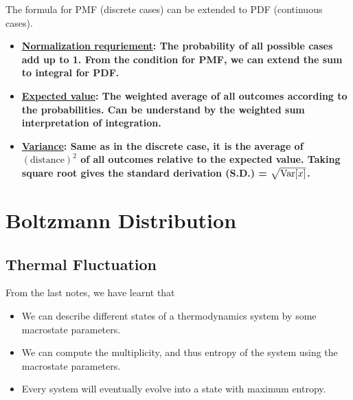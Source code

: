 \documentclass[class=article, crop=false, 12pt]{standalone}
\begin{document}
\newpage
The formula for PMF (discrete cases) can be extended to PDF (continuous cases).
\begin{itemize}
    \item \bf{\ul{Normalization requriement}}: 
    The probability of all possible cases add up to 1.
    From the condition for PMF, we can extend the sum to integral for PDF.

    \item \bf{\ul{Expected value}}: 
    The weighted average of all outcomes according to the probabilities.
    Can be understand by the weighted sum interpretation of integration.

    \item \bf{\ul{Variance}}:
    Same as in the discrete case, it is the average of $(\text{distance})^2$ of all outcomes relative to the expected value.
    Taking square root gives the standard derivation (S.D.) = $\sqrt{\Var{x}}$. 

\end{itemize}


\linesep
\section{Boltzmann Distribution}

\subsection{Thermal Fluctuation}

From the last notes, 
we have learnt that 
\begin{itemize}
    \item We can describe different states of a thermodynamics system by some macrostate parameters.
    \item We can compute the multiplicity, and thus entropy of the system using the macrostate parameters.
    \item Every system will eventually evolve into a state with maximum entropy. 
\end{itemize}
\end{document}
